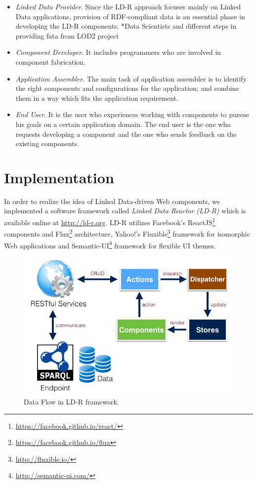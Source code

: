 \documentclass{acm_proc_article-sp}
\begin{document}
\begin{itemize}

\item \emph{Linked Data Provider}.
Since the LD-R approach focuses mainly on Linked Data applications, provision of RDF-compliant data is an essential phase in developing the LD-R components.
*Data Scientists and different steps in providing fata from LOD2 project

\item \emph{Component Developer}. 
It includes programmers who are involved in component fabrication.


\item \emph{Application Assembler}.
The main task of application assembler is to identify the right components and configurations for the application; and combine them in a way which fits the application requirement. 

\item \emph{End User}. 
It is the user who experiences working with components to pursue his goals on a certain application domain.
The end user is the one who requests developing a component and the one who sends feedback on the existing components.

\end{itemize}

\section{Implementation}

In order to realize the idea of Linked Data-driven Web components, we implemented a software framework called \emph{Linked Data Reactor (LD-R)} which is available online at \url{http://ld-r.org}.
LD-R utilizes Facebook's ReactJS\footnote{\url{https://facebook.github.io/react/}} components and Flux\footnote{\url{https://facebook.github.io/flux}} architecture, Yahoo!'s Fluxible\footnote{\url{http://fluxible.io/}} framework for isomorphic Web applications and Semantic-UI\footnote{\url{http://semantic-ui.com/}} framework for flexible UI themes.


\begin{figure}[tb]
  \includegraphics[width=.9\linewidth]{images/dataflow.jpg}
  \caption{Data Flow in LD-R framework.}
  \label{fig:dataflow}
\end{figure}
\end{document}
